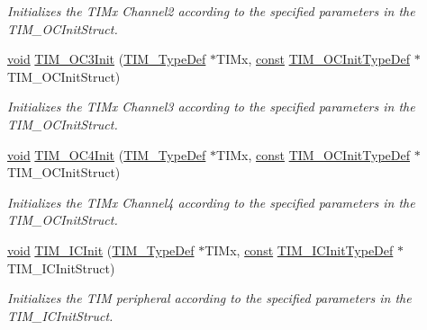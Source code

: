 \begin{DoxyCompactItemize}
\begin{DoxyCompactList}\small\item\em Initializes the T\-I\-Mx Channel2 according to the specified parameters in the T\-I\-M\-\_\-\-O\-C\-Init\-Struct. \end{DoxyCompactList}\item 
\hyperlink{group___n_a_m_e_ga18028b8badbf1ea7e704ccac3c488e82}{void} \hyperlink{group___t_i_m___exported___functions_ga85a395008ee7ad08d04fb6f85e993521}{T\-I\-M\-\_\-\-O\-C3\-Init} (\hyperlink{struct_t_i_m___type_def}{T\-I\-M\-\_\-\-Type\-Def} $\ast$T\-I\-Mx, \hyperlink{group___n_a_m_e_ga7ae6d0e43244213b34de2c2b9aa30da6}{const} \hyperlink{struct_t_i_m___o_c_init_type_def}{T\-I\-M\-\_\-\-O\-C\-Init\-Type\-Def} $\ast$T\-I\-M\-\_\-\-O\-C\-Init\-Struct)
\begin{DoxyCompactList}\small\item\em Initializes the T\-I\-Mx Channel3 according to the specified parameters in the T\-I\-M\-\_\-\-O\-C\-Init\-Struct. \end{DoxyCompactList}\item 
\hyperlink{group___n_a_m_e_ga18028b8badbf1ea7e704ccac3c488e82}{void} \hyperlink{group___t_i_m___exported___functions_ga8bd368bec7d55ae8ed73cbb7cca8f85a}{T\-I\-M\-\_\-\-O\-C4\-Init} (\hyperlink{struct_t_i_m___type_def}{T\-I\-M\-\_\-\-Type\-Def} $\ast$T\-I\-Mx, \hyperlink{group___n_a_m_e_ga7ae6d0e43244213b34de2c2b9aa30da6}{const} \hyperlink{struct_t_i_m___o_c_init_type_def}{T\-I\-M\-\_\-\-O\-C\-Init\-Type\-Def} $\ast$T\-I\-M\-\_\-\-O\-C\-Init\-Struct)
\begin{DoxyCompactList}\small\item\em Initializes the T\-I\-Mx Channel4 according to the specified parameters in the T\-I\-M\-\_\-\-O\-C\-Init\-Struct. \end{DoxyCompactList}\item 
\hyperlink{group___n_a_m_e_ga18028b8badbf1ea7e704ccac3c488e82}{void} \hyperlink{group___t_i_m___exported___functions_ga3b025c0c223151695ca9141766e2b249}{T\-I\-M\-\_\-\-I\-C\-Init} (\hyperlink{struct_t_i_m___type_def}{T\-I\-M\-\_\-\-Type\-Def} $\ast$T\-I\-Mx, \hyperlink{group___n_a_m_e_ga7ae6d0e43244213b34de2c2b9aa30da6}{const} \hyperlink{struct_t_i_m___i_c_init_type_def}{T\-I\-M\-\_\-\-I\-C\-Init\-Type\-Def} $\ast$T\-I\-M\-\_\-\-I\-C\-Init\-Struct)
\begin{DoxyCompactList}\small\item\em Initializes the T\-I\-M peripheral according to the specified parameters in the T\-I\-M\-\_\-\-I\-C\-Init\-Struct. \end{DoxyCompactList}\item 

\end{DoxyCompactItemize}
